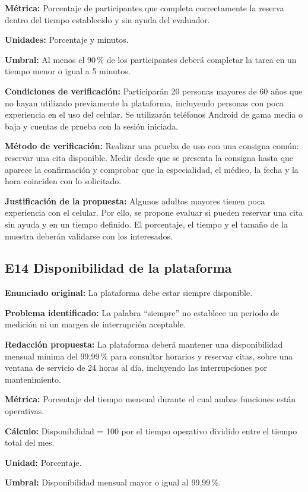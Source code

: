 \documentclass[11pt,a4paper]{article}
\begin{document}
\textbf{Métrica:}
Porcentaje de participantes que completa
correctamente la reserva dentro del tiempo
establecido y sin ayuda del evaluador.

\textbf{Unidades:} Porcentaje y minutos.

\textbf{Umbral:}
Al menos el 90\,\% de los participantes deberá
completar la tarea en un tiempo menor o
igual a 5 minutos.

\textbf{Condiciones de verificación:}
Participarán 20 personas mayores de 60 años
que no hayan utilizado previamente la plataforma,
incluyendo personas con poca experiencia
en el uso del celular. Se utilizarán teléfonos
Android de gama media o baja y cuentas de prueba
con la sesión iniciada.

\textbf{Método de verificación:}
Realizar una prueba de uso con una consigna
común: reservar una cita disponible.
Medir desde que se presenta la consigna hasta
que aparece la confirmación y comprobar
que la especialidad, el médico, la fecha
y la hora coinciden con lo solicitado.

\textbf{Justificación de la propuesta:}
Algunos adultos mayores tienen poca experiencia
con el celular. Por ello, se propone evaluar
si pueden reservar una cita sin ayuda y
en un tiempo definido. El porcentaje, el tiempo
y el tamaño de la muestra deberán validarse
con los interesados.

\subsection{E14 Disponibilidad de la plataforma}

\textbf{Enunciado original:}
La plataforma debe estar siempre disponible.

\textbf{Problema identificado:}
La palabra ``siempre'' no establece un periodo
de medición ni un margen de interrupción aceptable.

\textbf{Redacción propuesta:}
La plataforma deberá mantener una disponibilidad
mensual mínima del 99,99\,\% para consultar
horarios y reservar citas, sobre una ventana
de servicio de 24 horas al día, incluyendo
las interrupciones por mantenimiento.

\textbf{Métrica:}
Porcentaje del tiempo mensual durante el cual
ambas funciones están operativas.

\textbf{Cálculo:}
Disponibilidad = 100 por el tiempo operativo
dividido entre el tiempo total del mes.

\textbf{Unidad:} Porcentaje.

\textbf{Umbral:}
Disponibilidad mensual mayor o igual
al 99,99\,\%.
\end{document}
